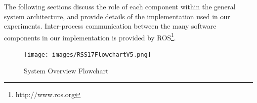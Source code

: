 \documentclass[conference]{IEEEtran}
\newcommand{\separator}{ \noindent \rule{\columnwidth}{1pt} }
\newenvironment{old}{\color{Maroon} \separator \textbf{[\textit{Old:}]} }{\ignorespacesafterend \separator}
\begin{document}
The following sections discuss the role of each component within the general system architecture, and provide details of the implementation used in our experiments. Inter-process communication between the many software components in our implementation is provided by ROS\footnote{http://www.ros.org}.  
%


%
\begin{figure}
\begin{center}
\texttt{[image: images/RSS17FlowchartV5.png]}
\caption{System Overview Flowchart}
\label{fig:overview}
\end{center}
\vspace{-1em}
\end{figure}
\end{document}
